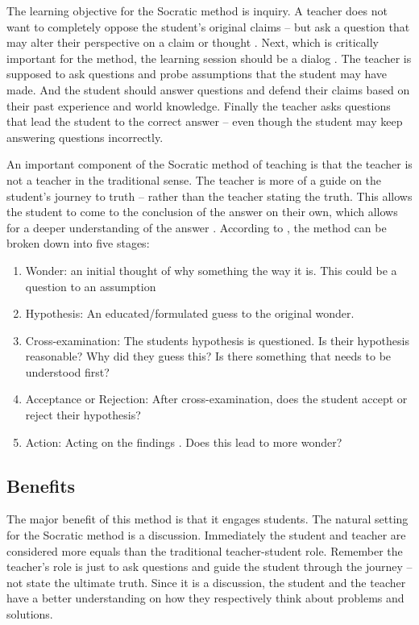 \documentclass{sigchi}
\begin{document}
  The learning objective for the Socratic method is inquiry. A teacher does not want to completely oppose the student’s original claims -- but ask a question that may alter their perspective on a claim or thought \cite{Dillon}. Next, which is critically important for the method, the learning session should be a dialog \cite{Dillon}. The teacher is supposed to ask questions and probe assumptions that the student may have made. And the student should answer questions and defend their claims based on their past experience and world knowledge. Finally the teacher asks questions that lead the student to the correct answer -- even though the student may keep answering questions incorrectly.
  
  An important component of the Socratic method of teaching is that the teacher is not a teacher in the traditional sense. The teacher is more of a guide on the student’s journey to truth -- rather than the teacher stating the truth. This allows the student to come to the conclusion of the answer on their own, which allows for a deeper understanding of the answer \cite{Bećirović}. According to  \cite{Bećirović}, the method can be broken down into five stages:
  \begin{enumerate}
  \item Wonder: an initial thought of why something the way it is. This could be a question to an assumption
  \item Hypothesis: An educated/formulated guess to the original wonder.
  \item Cross-examination: The students hypothesis is questioned. Is their hypothesis reasonable? Why did they guess this? Is there something that needs to be understood first?
  \item Acceptance or Rejection: After cross-examination, does the student accept or reject their hypothesis?
  \item Action: Acting on the findings \cite{Boghossian}. Does this lead to more wonder?
  \end{enumerate}
  \subsection{Benefits}
  The major benefit of this method is that it engages students. The natural setting for the Socratic method is a discussion. Immediately the student and teacher are considered more equals than the traditional teacher-student role. Remember the teacher’s role is just to ask questions and guide the student through the journey -- not state the ultimate truth. Since it is a discussion, the student and the teacher have a better understanding on how they respectively think about problems and solutions.
  
\end{document}
